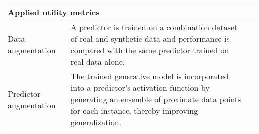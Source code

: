 \begin{table}
\begin{tabular}{@{} p{} p{} p{} @{}}
        \multicolumn{3}{Y}{\textbf{Applied utility metrics}}\\ \midrule

        
        Data augmentation & A predictor is trained on a combination dataset of real and synthetic data and performance is compared with the same predictor trained on real data alone. & \cite{Yoon2018-mo}\\
        
        Predictor augmentation & The trained generative model is incorporated into a predictor's activation function by generating an ensemble of proximate data points for each instance, thereby improving generalization. & \cite{Che_2017}\\
        
        \bottomrule
        
        \end{tabular}
\end{table}

